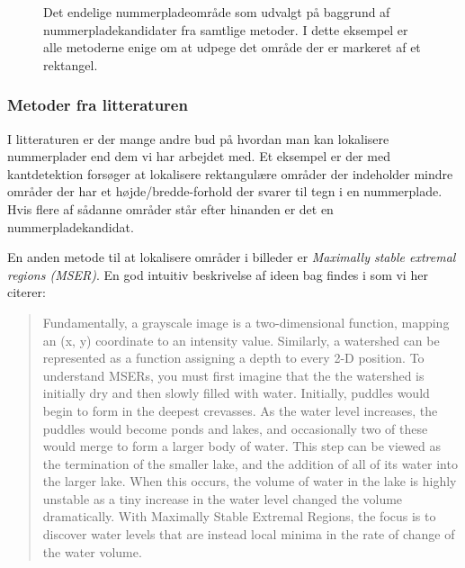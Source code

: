 \begin{figure}[htp]
  \centering
  \caption{Det endelige nummerpladeområde som udvalgt på baggrund af nummerpladekandidater fra samtlige metoder. I dette eksempel er alle metoderne enige om at udpege det område der er markeret af et rektangel.}
  \label{fig:DetectMain-result}  
\end{figure}

\subsubsection{Metoder fra litteraturen}
I litteraturen er der mange andre bud på hvordan man kan lokalisere nummerplader end dem vi har arbejdet med. Et eksempel er \cite{parker} der med kantdetektion forsøger at lokalisere rektangulære områder der indeholder mindre områder der har et højde/bredde-forhold der svarer til tegn i en nummerplade. Hvis flere af sådanne områder står efter hinanden er det en nummerpladekandidat.

En anden metode til at lokalisere områder i billeder er \textit{Maximally stable extremal regions (MSER)}. En god intuitiv beskrivelse af ideen bag findes i \cite{murphy} som vi her citerer:
\begin{quote}
Fundamentally, a grayscale image is a two-dimensional function, mapping an (x, y) coordinate to an intensity value. Similarly, a watershed can be represented as a function assigning a depth to every 2-D position. To understand MSERs, you must first imagine that the the watershed is initially dry and then slowly filled with water. Initially, puddles would begin to form in the deepest crevasses. As the water level increases, the puddles would become ponds and lakes, and occasionally two of these would merge to form a larger body of water. This step can be viewed as the termination of the smaller lake, and the addition of all of its water into the larger lake. When this occurs, the volume of water in the lake is highly unstable as a tiny increase in the water level changed the volume dramatically. With Maximally Stable Extremal Regions, the focus is to discover water levels that are instead local minima in the rate of change of the water volume.
\end{quote}


